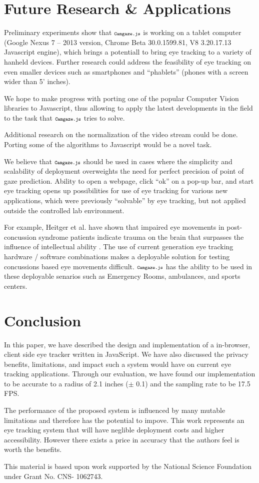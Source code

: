 \documentclass[annual]{acmsiggraph}
\newcommand{\Acronym}[1]{\ensuremath{{\small{\texttt{#1}}}}}
\newcommand{\Name}{\Acronym{Camgaze.js}} \newcommand{\False}{\Constant{false}}
\newcommand{\Constant}[1]{\ensuremath{\small{\texttt{#1}}}}
\begin{document}
\section{Future Research \& Applications}

Preliminary experiments show that $\Name$ is working on a tablet computer
(Google Nexus 7 -- 2013 version, Chrome Beta 30.0.1599.81, V8 3.20.17.13
Javascript engine), which brings a potentiall to bring eye tracking to a
variety of hanheld devices. Further research could address the feasibility of
eye tracking on even smaller devices such as smartphones and “phablets” (phones
with a screen wider than 5’ inches).

We hope to make progress with porting one of the popular Computer Vision
libraries to Javascript, thus allowing to apply the latest developments in the
field to the task that $\Name$ tries to solve.

Additional research on the normalization of the video stream could be done.
Porting some of the algorithms to Javascript would be a novel task.

We believe that $\Name$ should be used in cases where the simplicity and
scalability of deployment overweights the need for perfect precision of point
of gaze prediction. Ability to open a webpage, click “ok” on a pop-up bar, and
start eye tracking opens up possibilities for use of eye tracking for various
new applications, which were previously “solvable” by eye tracking, but not
applied outside the controlled lab environment.

For example, Heitger et al. have shown that impaired eye movements in
post-concussion syndrome patients indicate trauma on the brain that surpasses
the influence of intellectual ability \cite{Heitger2009}. The use of current
generation eye tracking hardware / software combinations makes a deployable
solution for testing concussions based eye movements difficult. $\Name$ has the
ability to be used in these deployable senarios such as Emergency Rooms,
ambulances, and sports centers.

\section{Conclusion}

In this paper, we have described the design and implementation of a in-browser,
client side eye tracker written in JavaScript. We have also discussed the
privacy benefits, limitations, and impact such a system would have on current
eye tracking applications. Through our evaluation, we have found our
implementation to be accurate to a radius of 2.1 inches ($\pm$ 0.1) and the
sampling rate to be 17.5 FPS.

The performance of the proposed system is influenced by many mutable
limitations and therefore has the potential to impove. This work represents an
eye tracking system that will have neglible deployment costs and higher
accessibility. However there exists a price in accuracy that the authors feel
is worth the benefits.

This material is based upon work supported by the National Science Foundation
under Grant No. CNS- 1062743.



\end{document}
